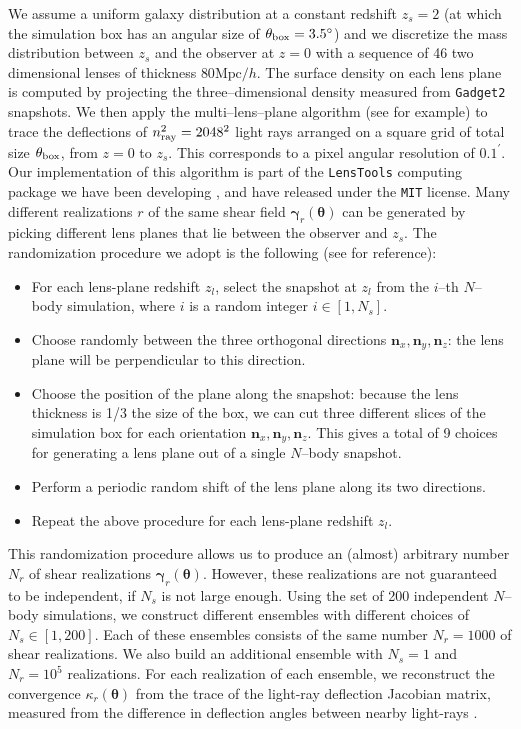 \documentclass[reprint,aps,prd,superscriptaddress,showkeys,showpacs]{revtex4-1}
\newcommand{\bb}[1]{\mathbf{#1}}
\begin{document}
We assume a uniform galaxy distribution at a constant redshift $z_s=2$
(at which the simulation box has an angular size of $\theta_{\rm
  box}=3.5^\circ$) and we discretize the mass distribution
between $z_s$ and the observer at $z=0$ with a sequence of 46 two
dimensional lenses of thickness $80\mathrm{Mpc}/h$. The surface
density on each lens plane is computed by projecting the
three--dimensional density measured from \texttt{Gadget2}
snapshots. We then apply the multi--lens--plane algorithm (see
\citep{RayTracingHartlap,RayTracingJain} for example) to trace the
deflections of $n_{\rm ray}^2=2048^2$ light rays arranged on a square grid
of total size $\theta_{\rm box}$, from $z=0$ to $z_s$. This corresponds to a pixel angular resolution of $0.1^\prime$. 
Our implementation of this algorithm is part of the \texttt{LensTools}
computing package we have been developing \citep{LensTools}, and have
released under the \texttt{MIT} license. Many different realizations
$r$ of the same shear field $\pmb{\gamma}_r(\pmb{\theta})$ can be
generated by picking different lens planes that lie between the
observer and $z_s$. The randomization procedure we adopt is the
following (see \citep{Sato12} for reference):

\begin{itemize}
\item For each lens-plane redshift $z_l$, select the snapshot at $z_l$ from the $i$--th $N$--body simulation, where $i$ is a random integer $i\in [1,N_s]$.
\item Choose randomly between the three orthogonal directions ${\bb{n}_x,\bb{n}_y,\bb{n}_z}$: the lens plane will be perpendicular to this direction.
\item Choose the position of the plane along the snapshot: because the lens thickness is 1/3 the size of the box, we can cut three different slices of the simulation box for each orientation ${\bb{n}_x,\bb{n}_y,\bb{n}_z}$. This gives a total of 9 choices for generating a lens plane out of a single $N$--body snapshot.
\item Perform a periodic random shift of the lens plane along its two directions.
\item Repeat the above procedure for each lens-plane redshift $z_l$.
\end{itemize}  
%
This randomization procedure allows us to produce an (almost)
arbitrary number $N_r$ of shear realizations
$\pmb{\gamma}_r(\pmb{\theta})$. However, these realizations are not
guaranteed to be independent, if $N_s$ is not large enough. Using the
set of 200 independent $N$--body simulations, we construct different
ensembles with different choices of $N_s\in[1,200]$. Each of these
ensembles consists of the same number $N_r=1000$ of shear
realizations. We also build an additional ensemble with $N_s=1$ and
$N_r=10^5$ realizations. For each realization of each ensemble, we
reconstruct the convergence $\kappa_r(\pmb{\theta})$ from the trace of
the light-ray deflection Jacobian matrix, measured from the difference
in deflection angles between nearby light-rays
\citep{RayTracingHartlap,RayTracingJain,Sato12}.
\end{document}
